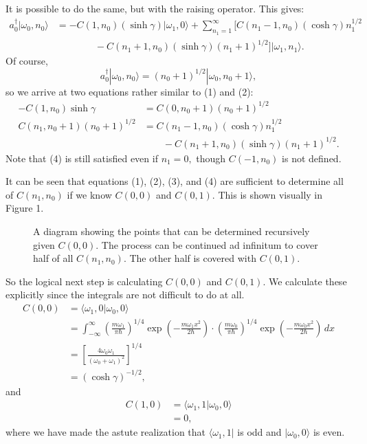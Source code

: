 \documentclass[12pt]{article}
\begin{document}
It is possible to do the same, but with the raising operator.  This gives:
\begin{align*}
	a_0^{\dagger}|\omega_0,n_0\rangle &= -C(1,n_0)(\sinh \gamma)|\omega_1,0\rangle  + \sum_{n_1=1}^{\infty} \Big[ C(n_1-1,n_0)(\cosh \gamma)n_1^{1/2} \\
					  & \qquad \qquad - C(n_1+1,n_0)(\sinh \gamma) (n_1+1)^{1/2}\Big] |\omega_1,n_1\rangle .
\end{align*}
Of course,
\[
	a_0^{\dagger}|\omega_0,n_0\rangle  = (n_0+1)^{1/2}|\omega_0,n_0+1\rangle ,
\] 
so we arrive at two equations rather similar to (1) and (2):
\begin{align}
	-C(1,n_0)\sinh \gamma &= C(0,n_0+1)(n_0+1)^{1/2} \\
	C(n_1,n_0+1)(n_0+1)^{1/2} &= C(n_1-1,n_0)(\cosh \gamma)n_1^{1/2} \nonumber \\
				  & \qquad - C(n_1+1,n_0)(\sinh \gamma) (n_1+1)^{1/2}.
\end{align}
Note that (4) is still satisfied even if $n_1=0,$ though $C(-1,n_0)$ is not defined.

It can be seen that equations (1), (2), (3), and (4) are sufficient to determine all of $C(n_1,n_0)$ if we know $C(0,0)$ and $C(0,1)$.  This is shown visually in Figure 1.  

\begin{figure}[ht]
	\centering
	\caption{A diagram showing the points that can be determined recursively given $C(0,0).$  The process can be continued ad infinitum to cover half of all $C(n_1,n_0)$.  The other half is covered with $C(0,1)$.}
\end{figure}

So the logical next step is calculating $C(0,0)$ and $C(0,1)$.  We calculate these explicitly since the integrals are not difficult to do at all.
\begin{align*}
	C(0,0) &= \langle \omega_1,0|\omega_0,0\rangle \\
	       &= \int_{-\infty}^{\infty} \left(\frac{m\omega_1}{\pi \hbar}\right)^{1/4}\exp\left(-\frac{m\omega_1 x^2}{2\hbar}\right)\cdot \left(\frac{m\omega_0}{\pi \hbar}\right)^{1/4}\exp\left(-\frac{m\omega_0 x^2}{2\hbar}\right)\,\textit{d}x \\
	       &= \left[ \frac{4\omega_0\omega_1}{(\omega_0+\omega_1)^2}\right]^{1/4} \\
	       &= (\cosh \gamma)^{-1/2},
\end{align*}
and
\begin{align*}
	C(1,0) &= \langle \omega_1,1|\omega_0,0\rangle \\
	       &= 0,
\end{align*}
where we have made the astute realization that $\langle \omega_1,1|$ is odd and $|\omega_0,0\rangle $ is even.
\end{document}
